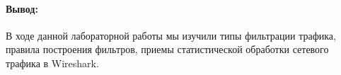 \paragraph{Вывод:}
В ходе данной лабораторной работы мы изучили типы фильтрации трафика, правила построения фильтров, приемы статистической обработки сетевого трафика в Wireshark.